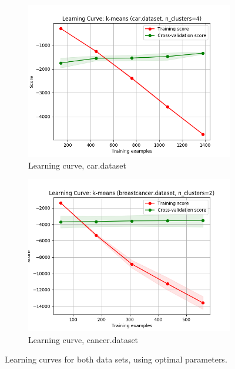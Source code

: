 \documentclass{article}
\begin{document}
        \begin{figure}[htb]
        \centering

          \begin{subfigure}{0.5\textwidth}
            \includegraphics[width=\linewidth]{out/kmeans/car-learning.png}
            \caption{Learning curve, car.dataset}
            \label{fig:kmeans-learning-car}
          \end{subfigure}\hfil
          \begin{subfigure}{0.5\textwidth}
            \includegraphics[width=\linewidth]{out/kmeans/cancer-learning.png}
            \caption{Learning curve, cancer.dataset}
            \label{fig:kmeans-learning-cancer}
          \end{subfigure}

        \caption{Learning curves for both data sets, using optimal parameters.}
        \label{fig:kmeans-learning}
        \end{figure}
\end{document}
